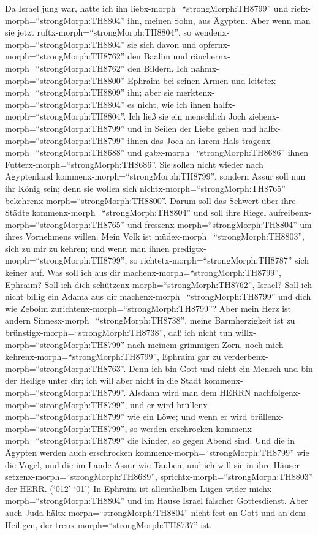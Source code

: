  Da Israel jung war, hatte ich ihn
liebx-morph=``strongMorph:TH8799'' und
riefx-morph=``strongMorph:TH8804'' ihn, meinen Sohn, aus Ägypten.
 Aber wenn man sie jetzt ruftx-morph=``strongMorph:TH8804'',
so wendenx-morph=``strongMorph:TH8804'' sie sich davon und
opfernx-morph=``strongMorph:TH8762'' den Baalim und
räuchernx-morph=``strongMorph:TH8762'' den Bildern.  Ich
nahmx-morph=``strongMorph:TH8800'' Ephraim bei seinen Armen und
leitetex-morph=``strongMorph:TH8809'' ihn; aber sie
merktenx-morph=``strongMorph:TH8804'' es nicht, wie ich ihnen
halfx-morph=``strongMorph:TH8804''.  Ich ließ sie ein
menschlich Joch ziehenx-morph=``strongMorph:TH8799'' und in Seilen der
Liebe gehen und halfx-morph=``strongMorph:TH8799'' ihnen das Joch an
ihrem Hals tragenx-morph=``strongMorph:TH8688'' und
gabx-morph=``strongMorph:TH8686'' ihnen
Futterx-morph=``strongMorph:TH8686''.  Sie sollen nicht
wieder nach Ägyptenland kommenx-morph=``strongMorph:TH8799'', sondern
Assur soll nun ihr König sein; denn sie wollen sich
nichtx-morph=``strongMorph:TH8765''
bekehrenx-morph=``strongMorph:TH8800''.  Darum soll das
Schwert über ihre Städte kommenx-morph=``strongMorph:TH8804'' und soll
ihre Riegel aufreibenx-morph=``strongMorph:TH8765'' und
fressenx-morph=``strongMorph:TH8804'' um ihres Vornehmens willen.
 Mein Volk ist müdex-morph=``strongMorph:TH8803'', sich zu
mir zu kehren; und wenn man ihnen predigtx-morph=``strongMorph:TH8799'',
so richtetx-morph=``strongMorph:TH8787'' sich keiner auf. 
Was soll ich aus dir machenx-morph=``strongMorph:TH8799'', Ephraim? Soll
ich dich schützenx-morph=``strongMorph:TH8762'', Israel? Soll ich nicht
billig ein Adama aus dir machenx-morph=``strongMorph:TH8799'' und dich
wie Zeboim zurichtenx-morph=``strongMorph:TH8799''? Aber mein Herz ist
andern Sinnesx-morph=``strongMorph:TH8738'', meine Barmherzigkeit ist zu
brünstigx-morph=``strongMorph:TH8738'',  daß ich nicht tun
willx-morph=``strongMorph:TH8799'' nach meinem grimmigen Zorn, noch mich
kehrenx-morph=``strongMorph:TH8799'', Ephraim gar zu
verderbenx-morph=``strongMorph:TH8763''. Denn ich bin Gott und nicht ein
Mensch und bin der Heilige unter dir; ich will aber nicht in die Stadt
kommenx-morph=``strongMorph:TH8799''.  Alsdann wird man dem
HERRN nachfolgenx-morph=``strongMorph:TH8799'', und er wird
brüllenx-morph=``strongMorph:TH8799'' wie ein Löwe; und wenn er wird
brüllenx-morph=``strongMorph:TH8799'', so werden erschrocken
kommenx-morph=``strongMorph:TH8799'' die Kinder, so gegen Abend sind.
 Und die in Ägypten werden auch erschrocken
kommenx-morph=``strongMorph:TH8799'' wie die Vögel, und die im Lande
Assur wie Tauben; und ich will sie in ihre Häuser
setzenx-morph=``strongMorph:TH8689'',
sprichtx-morph=``strongMorph:TH8803'' der HERR. 
(`012'-`01') In Ephraim ist allenthalben Lügen wider
michx-morph=``strongMorph:TH8804'' und im Hause Israel falscher
Gottesdienst. Aber auch Juda hältx-morph=``strongMorph:TH8804'' nicht
fest an Gott und an dem Heiligen, der treux-morph=``strongMorph:TH8737''
ist.

